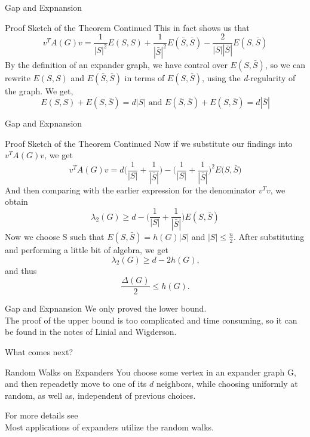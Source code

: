 \documentclass[10pt]{beamer}
\begin{document}
\begin{frame}{Gap and Expnansion}
    \begin{block}{Proof Sketch of the Theorem Continued}
        This in fact shows us that
        \[v^TA(G)v = \frac{1}{{|S|}^2}E(S,S) + \frac{1}{{|\bar{S}|}^2}E(\bar{S},\bar{S})-\frac{2}{|S||\bar{S}|}E(S,\bar{S})\]
        \pause{}
        By the definition of an expander graph, we have control over $E(S,\bar{S})$, so we can rewrite $E(S,S)$ and $E(\bar{S},\bar{S})$ in terms of $E(S,\bar{S})$, using the \textit{d}-regularity of the graph.
        \pause{}
        We get, 
        \[E(S,S)+E(S,\bar{S})=d|S| \text{ and } E(\bar{S},\bar{S})+E(S,\bar{S})=d|\bar{S}|\]
    \end{block}
\end{frame}

\begin{frame}{Gap and Expnansion}
    \begin{block}{Proof Sketch of the Theorem Continued}
        Now if we substitute our findings into $v^TA(G)v$, we get
        \[v^TA(G)v=d\Big(\frac{1}{|S|}+\frac{1}{|\bar{S}|}\Big)-\Big(\frac{1}{|S|}+\frac{1}{|\bar{S}|}\Big)^2E\Big(S,\bar{S}\Big)\]
        \pause{}
        And then comparing with the earlier expression for the denominator $v^Tv$, we obtain
        \[\lambda_2(G) \geq d - \Big(\frac{1}{|S|}+\frac{1}{|\bar{S}|}\Big)E(S,\bar{S})\]
        \pause{}
        Now we choose S such that $E(S,\bar{S}) = h(G)|S|$ and $|S| \leq \frac{n}{2}$.
        \pause{}
        After substituting and performing a little bit of algebra, we get
        \[\lambda_2(G) \geq d-2h(G)\text{,}\]
        \pause{}
        and thus
        \[\frac{\Delta(G)}{2} \leq h(G)\text{.}\]
    \end{block}
\end{frame}

\begin{frame}{Gap and Expnansion}
    We only proved the lower bound.\\
    \pause{}
    The proof of the upper bound is too complicated and time consuming, so it can be found in the notes of Linial and Wigderson.
\end{frame}

\begin{frame}{What comes next?}
    \begin{block}{Random Walks on Expanders}
        You choose some vertex in an expander graph G, and then repeadetly move to one of its $d$ neighbors, while choosing uniformly at random, as well as, independent of previous choices.
    \end{block}
    For more details see \cite{N}\\
    \vspace{2em}
    Most applications of expanders utilize the random walks.
\end{frame}
\end{document}
